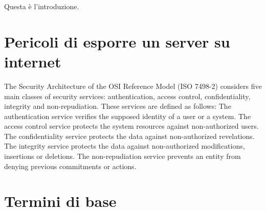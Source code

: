 Questa è l'introduzione.

\section{Pericoli di esporre un server su internet}

The Security Architecture of the OSI Reference Model (ISO 7498-2) considers five main classes of security services: authentication, access control, confidentiality, integrity and non-repudiation. These services are defined as follows: The authentication service verifies the supposed identity of a user or a system. The access control service protects the system resources against non-authorized users. The confidentiality service protects the data against non-authorized revelations. The integrity service protects the data against non-authorized modifications, insertions or deletions. The non-repudiation service prevents an entity from denying previous commitments or actions.


\section{Termini di base}

